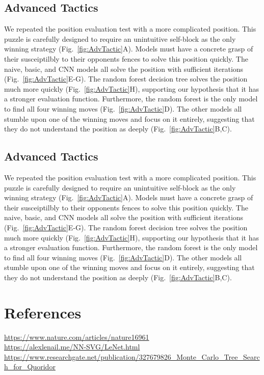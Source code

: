 \documentclass[10pt]{article}
\begin{document}
\subsection{Advanced Tactics}

We repeated the position evaluation test with a more complicated position. This puzzle is carefully designed to require an unintuitive self-block as the only winning strategy (Fig.~\ref{fig:AdvTactic}A). Models must have a concrete grasp of their susceiptilbly to their opponents fences to solve this position quickly. The naive, basic, and CNN models all solve the position with sufficient iterations (Fig.~\ref{fig:AdvTactic}E-G). The random forest decision tree solves the position much more quickly (Fig.~\ref{fig:AdvTactic}H), supporting our hypothesis that it has a stronger evaluation function. Furthermore, the random forest is the only model to find all four winning moves (Fig.~\ref{fig:AdvTactic}D). The other models all stumble upon one of the winning moves and focus on it entirely, suggesting that they do not understand the position as deeply (Fig.~\ref{fig:AdvTactic}B,C).

\subsection{Advanced Tactics}

We repeated the position evaluation test with a more complicated position. This puzzle is carefully designed to require an unintuitive self-block as the only winning strategy (Fig.~\ref{fig:AdvTactic}A). Models must have a concrete grasp of their susceiptilbly to their opponents fences to solve this position quickly. The naive, basic, and CNN models all solve the position with sufficient iterations (Fig.~\ref{fig:AdvTactic}E-G). The random forest decision tree solves the position much more quickly (Fig.~\ref{fig:AdvTactic}H), supporting our hypothesis that it has a stronger evaluation function. Furthermore, the random forest is the only model to find all four winning moves (Fig.~\ref{fig:AdvTactic}D). The other models all stumble upon one of the winning moves and focus on it entirely, suggesting that they do not understand the position as deeply (Fig.~\ref{fig:AdvTactic}B,C).

\section{References}
\url{https://www.nature.com/articles/nature16961}
\\\url{https://alexlenail.me/NN-SVG/LeNet.html}
\\\url{https://www.researchgate.net/publication/327679826_Monte_Carlo_Tree_Search_for_Quoridor}
\end{document}
